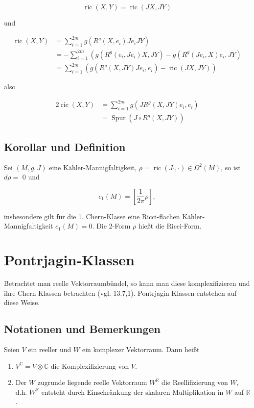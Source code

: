 \documentclass[10pt, letterpaper]{article}
\begin{document}
$$
\operatorname{ric}(X, Y)=\operatorname{ric}(J X, J Y)
$$

und

$$
\begin{aligned}
\operatorname{ric}(X, Y) & =\sum_{i=1}^{2 m} g\left(R^{g}\left(X, e_{i}\right) J e_{i} J Y\right) \\
& =-\sum_{i=1}^{2 m}\left(g\left(R^{g}\left(e_{i}, J e_{i}\right) X, J Y\right)-g\left(R^{g}\left(J e_{i}, X\right) e_{i}, J Y\right)\right. \\
& =\sum_{i=1}^{2 m}\left(g\left(R^{g}(X, J Y) J e_{i}, e_{i}\right)-\operatorname{ric}(J X, J Y)\right)
\end{aligned}
$$

also

$$
\begin{aligned}
2 \operatorname{ric}(X, Y) & =\sum_{i=1}^{2 m} g\left(J R^{g}(X, J Y) e_{i}, e_{i}\right) \\
& =\operatorname{Spur}\left(J \circ R^{g}(X, J Y)\right)
\end{aligned}
$$

\subsection*{Korollar und Definition}
Sei $(M, g, J)$ eine Kähler-Mannigfaltigkeit, $\rho=\operatorname{ric}(J \cdot, \cdot) \in \Omega^{2}(M)$, so ist $d \rho=$ 0 und

$$
c_{1}(M)=\left[\frac{1}{2 \pi} \rho\right],
$$

insbesondere gilt für die 1. Chern-Klasse eine Ricci-flachen Kähler-Mannigfaltigkeit $c_{1}(M)=0$. Die 2-Form $\rho$ hießt die Ricci-Form.

\section*{Pontrjagin-Klassen}
Betrachtet man reelle Vektorraumbündel, so kann man diese komplexifizieren und ihre Chern-Klassen betrachten (vgl. 13.7,1). Pontrjagin-Klassen entstehen auf diese Weise.

\subsection*{Notationen und Bemerkungen}
Seien $V$ ein reeller und $W$ ein komplexer Vektorraum. Dann heißt

\begin{enumerate}
  \item $V^{\mathbb{C}}=V \otimes \mathbb{C}$ die Komplexifizierung von $V$.
  \item Der $W$ zugrunde liegende reelle Vektorraum $W^{\mathbb{R}}$ die Reellifizierung von $W$, d.h. $W^{\mathbb{R}}$ entsteht durch Einschränkung der skalaren Multiplikation in $W$ auf $\mathbb{R}$.
\end{enumerate}
\end{document}

